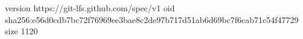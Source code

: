 version https://git-lfs.github.com/spec/v1
oid sha256:e56d0cdb7bc72f76969ee3bae8c2de97b717d51ab6d69bc7f6cab71c54f47729
size 1120
